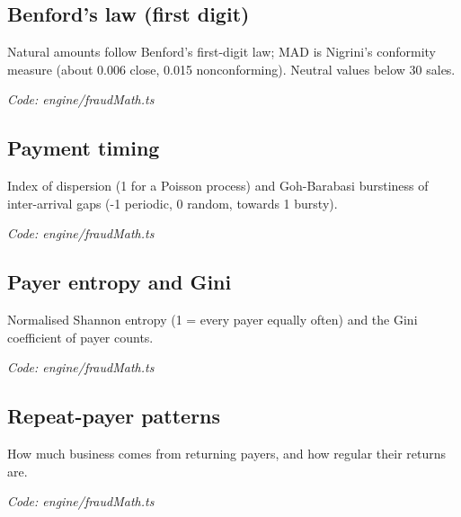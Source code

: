 \documentclass[11pt,a4paper]{article}
\newcommand{\where}[1]{\par{\small\itshape\color{mute}Code: #1}\par}
\begin{document}
\subsection*{Benford's law (first digit)}
\par\smallskip\noindent{}\par\smallskip
\par\smallskip\noindent{}\par\smallskip
Natural amounts follow Benford's first-digit law; MAD is Nigrini's conformity measure (about 0.006 close, 0.015 nonconforming). Neutral values below 30 sales.
\where{engine/fraudMath.ts}

\subsection*{Payment timing}
\par\smallskip\noindent{}\par\smallskip
Index of dispersion (1 for a Poisson process) and Goh-Barabasi burstiness of inter-arrival gaps (-1 periodic, 0 random, towards 1 bursty).
\where{engine/fraudMath.ts}

\subsection*{Payer entropy and Gini}
\par\smallskip\noindent{}\par\smallskip
Normalised Shannon entropy (1 = every payer equally often) and the Gini coefficient of payer counts.
\where{engine/fraudMath.ts}

\subsection*{Repeat-payer patterns}
\par\smallskip\noindent{}\par\smallskip
How much business comes from returning payers, and how regular their returns are.
\where{engine/fraudMath.ts}
\end{document}
